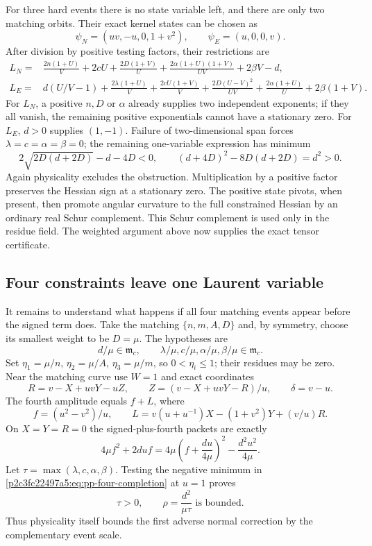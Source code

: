 For three hard events there is no state variable left, and there are only
two matching orbits.  Their exact kernel states can be chosen as
\[
 \psi_N=(uv,-u,0,1+v^2),\qquad \psi_E=(u,0,0,v).
\]
After division by positive testing factors, their restrictions are
\begin{align*}
 L_N={}&\frac{2n(1+U)}V+2cU+\frac{2D(1+V)}U
       +\frac{2\alpha(1+U)(1+V)}{UV}+2\beta V-d,\\
 L_E={}&d(U/V-1)+\frac{2\lambda(1+U)}V
       +\frac{2cU(1+V)}V+\frac{2D(U-V)^2}{UV}
       +\frac{2\alpha(1+U)}U+2\beta(1+V).
\end{align*}
For $L_N$, a positive $n,D$ or $\alpha$ already supplies two independent
exponents; if they all vanish, the remaining positive exponentials cannot
have a stationary zero.  For $L_E$, $d>0$ supplies $(1,-1)$.  Failure of
two-dimensional span forces $\lambda=c=\alpha=\beta=0$; the remaining
one-variable expression has minimum
\[
 2\sqrt{2D(d+2D)}-d-4D<0,
 \qquad (d+4D)^2-8D(d+2D)=d^2>0.
\]
Again physicality excludes the obstruction.  Multiplication by a positive
factor preserves the Hessian sign at a stationary zero.  The positive
state pivots, when present, then promote angular curvature to the full
constrained Hessian by an ordinary real Schur complement.  This Schur
complement is used only in the residue field.  The weighted argument above
now supplies the exact tensor certificate.

\subsection{Four constraints leave one Laurent variable}
It remains to understand what happens if all four matching events appear
before the signed term does.  Take the matching $\{n,m,A,D\}$ and, by
symmetry, choose its smallest weight to be $D=\mu$.  The hypotheses are
\[
 d/\mu\in\mathfrak m_c,\qquad
 \lambda/\mu,c/\mu,\alpha/\mu,\beta/\mu\in\mathfrak m_c.
\]
Set $\eta_1=\mu/n$, $\eta_2=\mu/A$, $\eta_3=\mu/m$, so
$0<\eta_i\leq1$; their residues may be zero.  Near the matching curve use
$W=1$ and exact coordinates
\[
 R=v-X+uvY-uZ,\qquad
 Z=(v-X+uvY-R)/u,\qquad \delta=v-u.
\]
The fourth amplitude equals $f+L$, where
\[
 f=(u^2-v^2)/u,\qquad
 L=v(u+u^{-1})X-(1+v^2)Y+(v/u)R.
\]
On $X=Y=R=0$ the signed-plus-fourth packets are exactly
\begin{equation}\label{p2c3fc22497a5:eq:pp-four-completion}
 4\mu f^2+2duf
 =4\mu\left(f+\frac{du}{4\mu}\right)^2
                  -\frac{d^2u^2}{4\mu}.
\end{equation}
Let $\tau=\max(\lambda,c,\alpha,\beta)$.  Testing the negative minimum in
\eqref{p2c3fc22497a5:eq:pp-four-completion} at $u=1$ proves
\[
                  \tau>0,\qquad \rho=\frac{d^2}{\mu\tau}
                  \text{ is bounded}.
\]
Thus physicality itself bounds the first adverse normal correction by the
complementary event scale.

